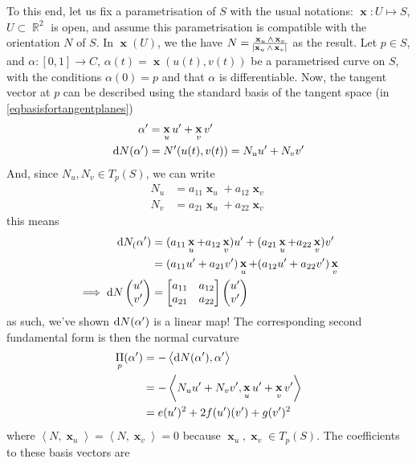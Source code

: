 \documentclass{amsart} %
\theoremstyle{mytheoremstyle}
\theoremstyle{definition}
\numberwithin{equation}{section}
\DeclareMathOperator{\R}{\mathbb{R}}
\DeclareMathOperator{\II}{II}
\DeclareMathOperator{\1}{\mathbbm{1}}
\DeclareMathOperator{\D}{\dif}
\DeclareMathOperator{\x}{\mathbf{x}}
\newcommand{\innerproduct}[2]{\left\langle #1,#2 \right\rangle}
\begin{document}
To this end, let us fix a parametrisation of $S$ with the usual notations: $\x : U \mapsto S$, $U \subset \R^2$ is open, and assume this parametrisation is compatible with the orientation $N$ of $S$. In $\x(U)$, we the have $N = \frac{\x_u \wedge \x_v}{\abs{\x_u \wedge \x_v}}$ as the result. Let $p \in S$, and $\alpha : [0,1] \to C$, $\alpha(t) = \x(u(t),v(t))$ be a parametrised curve on $S$, with the conditions $\alpha(0) = p$ and that $\alpha$ is differentiable. Now, the tangent vector at $p$ can be described using the standard basis of the tangent space (in \eqref{eqbasisfortangentplanes})
\begin{align*}
\alpha' &= \x_u u' + \x_v v' \\
\D N(\alpha') &= N'(u(t),v(t)) = N_u u' + N_v v'
\end{align*}
And, since $N_u, N_v \in T_p (S)$, we can write
\begin{align*}
	N_u &= a_{11} \x_u + a_{12} \x_{v} \\
	N_v &= a_{21} \x_u + a_{22} \x_{v}
\end{align*}
this means
\begin{align*}
	\D N_(\alpha') &= (a_{11} \x_u + a_{12} \x_{v}) u' + ( a_{21} \x_u + a_{22} \x_{v} ) v' \\
	&= (a_{11}u' + a_{21} v') \x_u + (a_{12} u' + a_{22} v') \x_v  \\
	\implies \D N \begin{pmatrix*}[c]
	u' \\ v'
	\end{pmatrix*} &= \begin{bmatrix*}[c]
	a_{11} & a_{12} \\ a_{21} & a_{22}
	\end{bmatrix*} \begin{pmatrix*}[c]
	u' \\ v'
	\end{pmatrix*}
\end{align*}
as such, we've shown $\D N(\alpha')$ is a linear map! The corresponding second fundamental form is then the normal curvature
\begin{align*}
	\II_p (\alpha') &= -\innerproduct{\D N(\alpha')}{\alpha'} \\
	 &= -\innerproduct{N_u u' + N_v v' }{\x_u u' + \x_v v'} \\
	 &= e(u')^2 + 2f (u')(v') + g (v')^2
\end{align*}
where $\innerproduct{N}{\x_u} = \innerproduct{N}{\x_v} = 0 $ because $\x_u,\x_v \in T_p (S)$. The coefficients to these basis vectors are
\end{document}
